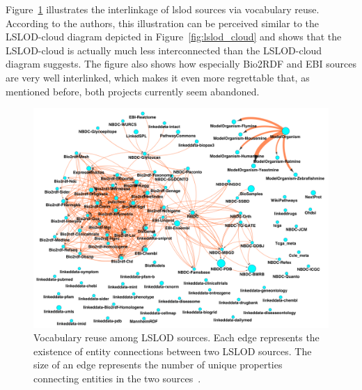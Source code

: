 \documentclass[runningheads]{llncs}
\begin{document}
    Figure~\ref{fig:lslod-cloud-corrected} illustrates the interlinkage of lslod sources via vocabulary reuse.
    According to the authors, this illustration can be perceived similar to the LSLOD-cloud diagram depicted in Figure~\ref{fig:lslod_cloud} and shows that the LSLOD-cloud is actually much less interconnected than the LSLOD-cloud diagram suggests.
    The figure also shows how especially Bio2RDF and EBI sources are very well interlinked, which makes it even more regrettable that, as mentioned before, both projects currently seem abandoned.

    \begin{figure}[ht]
        \centering
        \includegraphics[width=\textwidth]{figures/lslod-connectedness}
        \caption{Vocabulary reuse among LSLOD sources. Each edge represents the existence of entity connections between two LSLOD sources. The size of an edge represents the number of unique properties connecting entities in the two sources~\citep{kamdar2021empirical}.}
        \label{fig:lslod-cloud-corrected}
    \end{figure}
\end{document}
